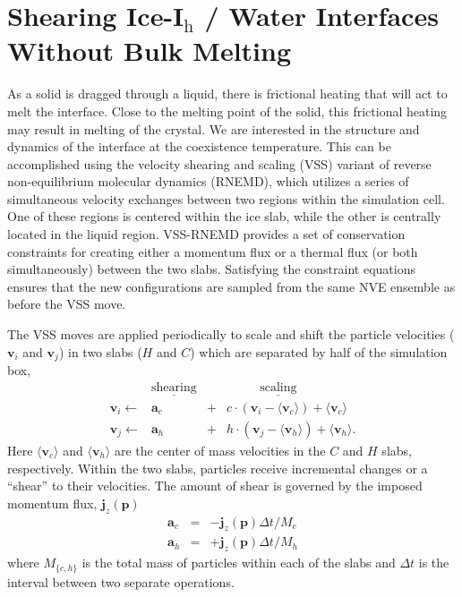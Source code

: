 \section{Shearing Ice-I$_\mathrm{h}$ / Water Interfaces Without Bulk Melting}

As a solid is dragged through a liquid, there is frictional heating
that will act to melt the interface.  Close to the melting point of the
solid, this frictional heating may result in melting of the crystal.
We are interested in the structure and dynamics of the interface at
the coexistence temperature.  This can be accomplished using the velocity
shearing and scaling (VSS) variant of reverse non-equilibrium
molecular dynamics (RNEMD), which utilizes a series of simultaneous
velocity exchanges between two regions within the simulation
cell.\cite{Kuang2012} One of these regions is centered within the ice
slab, while the other is centrally located in the liquid
region. VSS-RNEMD provides a set of conservation constraints for
creating either a momentum flux or a thermal flux (or both
simultaneously) between the two slabs.  Satisfying the constraint
equations ensures that the new configurations are sampled from the
same NVE ensemble as before the VSS move.

The VSS moves are applied periodically to scale and shift the particle
velocities ($\mathbf{v}_i$ and $\mathbf{v}_j$) in two slabs ($H$ and
$C$) which are separated by half of the simulation box,
\begin{displaymath}
\begin{array}{rclcl}

 & \underline{\mathrm{shearing}} & &
 \underline{~~~~~~~~~~~~\mathrm{scaling}~~~~~~~~~~~~} \\
\mathbf{v}_i \leftarrow & 
  \mathbf{a}_c\ & + & c\cdot\left(\mathbf{v}_i - \langle\mathbf{v}_c
  \rangle\right)  +  \langle\mathbf{v}_c\rangle \\
\mathbf{v}_j \leftarrow & 
  \mathbf{a}_h & + & h\cdot\left(\mathbf{v}_j - \langle\mathbf{v}_h
    \rangle\right) + \langle\mathbf{v}_h\rangle .

\end{array}
\end{displaymath}
Here $\langle\mathbf{v}_c\rangle$ and $\langle\mathbf{v}_h\rangle$ are
the center of mass velocities in the $C$ and $H$ slabs, respectively.
Within the two slabs, particles receive incremental changes or a
``shear'' to their velocities.  The amount of shear is governed by the
imposed momentum flux, $\mathbf{j}_z(\mathbf{p})$
\begin{eqnarray}
\mathbf{a}_c & = & - \mathbf{j}_z(\mathbf{p}) \Delta t / M_c \label{vss1}\\
\mathbf{a}_h & = & + \mathbf{j}_z(\mathbf{p}) \Delta t / M_h \label{vss2}
\end{eqnarray}
where $M_{\{c,h\}}$ is the total mass of particles within each of the
slabs and $\Delta t$ is the interval between two separate operations.

